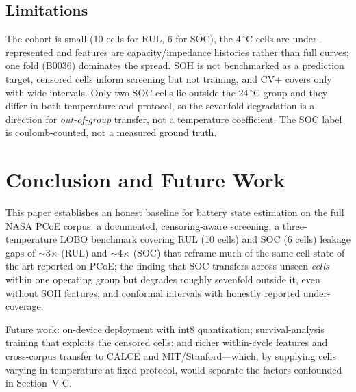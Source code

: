 \documentclass[conference,a4paper]{IEEEtran}
\begin{document}
\subsection{Limitations}
The cohort is small (10 cells for RUL, 6 for SOC), the 4\,$^\circ$C
cells are under-represented and features are capacity/impedance histories
rather than full curves; one fold (B0036) dominates the spread. SOH is not
benchmarked as a prediction target, censored cells inform screening but not
training, and CV+ covers only with wide intervals. Only two SOC cells lie
outside the 24\,$^\circ$C group and they differ in both temperature and
protocol, so the sevenfold degradation is a direction for
\emph{out-of-group} transfer, not a temperature coefficient. The SOC label
is coulomb-counted, not a measured ground truth.

\section{Conclusion and Future Work}
This paper establishes an honest baseline for battery state estimation on the
full NASA PCoE corpus: a documented, censoring-aware screening; a
three-temperature LOBO benchmark covering RUL (10 cells) and SOC (6 cells)
leakage gaps of $\sim$3$\times$ (RUL) and
$\sim$4$\times$ (SOC) that reframe much of the same-cell state of the art
reported on PCoE; the finding that SOC transfers across
unseen \emph{cells} within one operating group but degrades roughly
sevenfold outside it, even without SOH features; and conformal intervals with honestly reported
under-coverage.

Future work: on-device deployment with int8 quantization; survival-analysis
training that exploits the censored cells; and richer within-cycle
features and cross-corpus transfer to CALCE and MIT/Stanford---which, by supplying cells
varying in temperature at fixed protocol, would separate the factors
confounded in Section~V-C.

\balance
\end{document}
